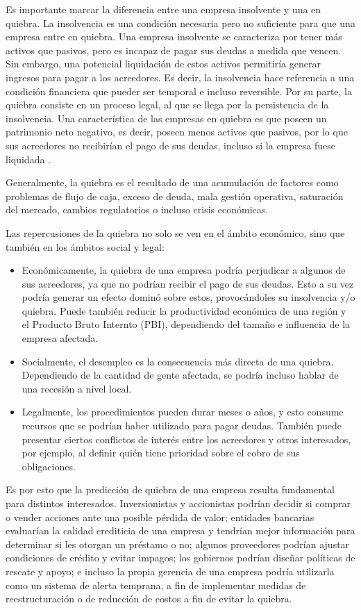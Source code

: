 Es importante marcar la diferencia entre una empresa insolvente y una en quiebra. La insolvencia es una condición necesaria pero no suficiente para que una empresa entre en quiebra. Una empresa insolvente se caracteriza por tener más activos que pasivos, pero es incapaz de pagar sus deudas a medida que vencen. Sin embargo, una potencial liquidación de estos activos permitiría generar ingresos para pagar a los acreedores. Es decir, la insolvencia hace referencia a una condición financiera que pueder ser temporal e incluso reversible. Por su parte, la quiebra consiste en un proceso legal, al que se llega por la persistencia de la insolvencia. Una característica de las empresas en quiebra es que poseen un patrimonio neto negativo, es decir, poseen menos activos que pasivos, por lo que sus acreedores no recibirían el pago de sus deudas, incluso si la empresa fuese liquidada \citep{article:corporate_bankruptcy}.

Generalmente, la quiebra es el resultado de una acumulación de factores como problemas de flujo de caja, exceso de deuda, mala gestión operativa, saturación del mercado, cambios regulatorios o incluso crisis económicas.

Las repercusiones de la quiebra no solo se ven en el ámbito económico, sino que también en los ámbitos social y legal:

\begin{itemize}
    \item Económicamente, la quiebra de una empresa podría perjudicar a algunos de sus acreedores, ya que no podrían recibir el pago de sus deudas. Esto a su vez podría generar un efecto dominó sobre estos, provocándoles su insolvencia y/o quiebra. Puede también reducir la productividad económica de una región y el Producto Bruto Internto (PBI), dependiendo del tamaño e influencia de la empresa afectada.
    \item Socialmente, el desempleo es la consecuencia más directa de una quiebra. Dependiendo de la cantidad de gente afectada, se podría incluso hablar de una recesión a nivel local.
    \item Legalmente, los procedimientos pueden durar meses o años, y esto consume recursos que se podrían haber utilizado para pagar deudas. También puede presentar ciertos conflictos de interés entre los acreedores y otros interesados, por ejemplo, al definir quién tiene prioridad sobre el cobro de sus obligaciones.
\end{itemize}

Es por esto que la predicción de quiebra de una empresa resulta fundamental para distintos interesados. Inversionistas y accionistas podrían decidir si comprar o vender acciones ante una posible pérdida de valor; entidades bancarias evaluarían la calidad crediticia de una empresa y tendrían mejor información para determinar si les otorgan un préstamo o no; algunos proveedores podrían ajustar condiciones de crédito y evitar impagos; los gobiernos podrían diseñar políticas de rescate y apoyo; e incluso la propia gerencia de una empresa podría utilizarla como un sistema de alerta temprana, a fin de implementar medidas de reestructuración o de reducción de costos a fin de evitar la quiebra.

